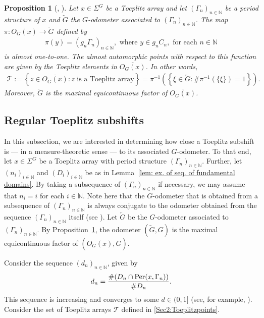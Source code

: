 \documentclass[titlepage,reqno,10pt]{amsart}
\newtheorem{proposition}[theorem]{Proposition}
\theoremstyle{definition}
\def\N{{\mathbb N}}
\def\Per{{\rm Per}}
\begin{document}
\begin{proposition}[\cite{CoPe08}, \cite{Kr10}]\label{MEF_Toeplitz}
    Let $x\in\Sigma^G$ be a Toeplitz array and let $(\Gamma_n)_{n\in\mathbb{N}}$ be a period structure of $x$ and $\overleftarrow{G}$ the $G$-odometer associated to $(\Gamma_n)_{n\in\mathbb{N}}$. 
    The map $\pi:\overline{O_G(x)}\to\overleftarrow{G}$ defined by 
    \begin{align*}
        \pi(y)=(g_n\Gamma_n)_{n\in\mathbb{N}}, \mbox{ where }y\in g_nC_n, \mbox{ for each }n\in\mathbb{N}
    \end{align*}
    is almost one-to-one. The almost automorphic points with respect to this function are given by the Toeplitz elements in $\overline{O_G(x)}$. In other words,
    \begin{align}\label{Sec2:Toeplitzpoints}
        \mathcal{T} := \left\{z\in\overline{O_G(x)}:z \mbox{ is a Toeplitz array}\right\}=\pi^{-1}\left(\left\{\xi\in\overleftarrow{G}: \#\pi^{-1}(\{\xi\})=1\right\}\right).
    \end{align}
    Moreover, $\overleftarrow{G}$ is the maximal equicontinuous factor of $\overline{O_G(x)}$. 
\end{proposition}

\subsection{Regular Toeplitz subshifts}\label{sec: regularity}

 In this subsection, we are interested in determining how close a Toeplitz subshift is --- in a measure-theoretic sense --- to its associated $G$-odometer. To that end, let $x\in\Sigma^G$ be a Toeplitz array with period structure $(\Gamma_n)_{n\in\mathbb{N}}$.
Further, let $(n_i)_{i\in\N}$ and $(D_i)_{i\in\mathbb{N}}$ be as in Lemma~\ref{lem: ex. of seq. of fundamental domains}. By taking a subsequence of $(\Gamma_n)_{n\in\mathbb{N}}$ if necessary, we may assume that $n_i=i$ for each $i\in\mathbb{N}$. 
Note here that the $G$-odometer that is obtained from a subsequence of $(\Gamma_n)_{n\in\N}$ is always conjugate to the odometer obtained from the sequence $(\Gamma_n)_{n\in\N}$ itself (see \cite[Lemma 2]{CoPe08}).
Let $\overleftarrow{G}$ be the $G$-odometer associated to $(\Gamma_n)_{n\in\mathbb{N}}$. By Proposition~\ref{MEF_Toeplitz}, the odometer $(\overleftarrow{G},G)$ is the maximal equicontinuous factor of $(\overline{O_G(x)},G)$. 

Consider the sequence $(d_n)_{n\in\mathbb{N}}$, given by
\begin{align*}
    d_n=\dfrac{\#(D_n\cap \Per(x,\Gamma_n))}{\#D_n}.
\end{align*}
This sequence is increasing and converges to some $d\in(0,1]$ (see, for example, \cite{CeCoGo23}).
Consider the set of Toeplitz arrays $\mathcal{T}$ defined in \eqref{Sec2:Toeplitzpoints}.
\end{document}
